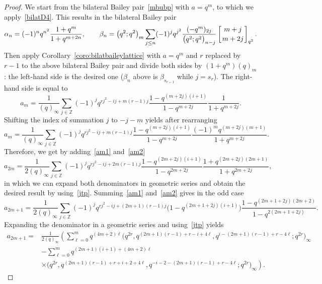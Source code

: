 \documentclass[pdftex]{sigma}
\numberwithin{equation}{section}
\begin{document}
\begin{proof}
We start from the bilateral Bailey pair~\eqref{mbubp} with $a=q^m$, to which we apply~\eqref{bilatD4}. This results in the bilateral Bailey pair
\begin{equation*}
\alpha_n=(-1)^nq^{n^2}\frac{1+q^{m}}{1+q^{m+2n}},\qquad\beta_n=\bigl(q^2;q^2\bigr)_m\sum_{j\leq n}(-1)^jq^{j^2}\frac{(-q^m)_{2j}}{\bigl(q^2;q^2\bigr)_{n-j}}\left[{m+j\atop m+2j}\right]_{q^2}.
\end{equation*}
Then apply Corollary~\ref{coro:bilatbaileylattice} with $a=q^m$ and $r$ replaced by $r-1$ to the above bilateral Bailey pair and divide both sides by $(1+q^m)(q)_m$: the left-hand side is the desired one ($\beta_n$ above is $\beta_{s_{r-1}}$ while $j=s_r$). The right-hand side is equal to
\begin{equation}\label{am1}
a_m=\frac{1}{(q)_\infty}\sum_{j\in\mathbb{Z}}(-1)^jq^{rj^2-ij+m(r-1)j}\frac{1-q^{(m+2j)(i+1)}}{1-q^{m+2j}}\frac{1}{1+q^{m+2j}}.
\end{equation}
Shifting the index of summation $j$ to $-j-m$ yields after rearranging
\begin{equation}\label{am2}
a_m=\frac{1}{(q)_\infty}\sum_{j\in\mathbb{Z}}(-1)^jq^{rj^2-ij+m(r-1)j}\frac{1-q^{(m+2j)(i+1)}}{1-q^{m+2j}}\frac{(-1)^mq^{(m+2j)(m+1)}}{1+q^{m+2j}}.
\end{equation}
Therefore, we get by adding~\eqref{am1} and~\eqref{am2}
\begin{equation*}
a_{2m}=\frac{1}{2(q)_\infty}\sum_{j\in\mathbb{Z}}(-1)^jq^{rj^2-ij+2m(r-1)j}\frac{1-q^{(2m+2j)(i+1)}}{1-q^{2m+2j}}\frac{1+q^{(2m+2j)(2m+1)}}{1+q^{2m+2j}},
\end{equation*}
in which we can expand both denominators in geometric series and obtain the desired result by using~\eqref{jtp}. Summing~\eqref{am1} and~\eqref{am2} gives in the odd case
\begin{equation*}
a_{2m+1}=\frac{1}{2(q)_\infty}\sum_{j\in\mathbb{Z}}(-1)^jq^{rj^2-ij+(2m+1)(r-1)j}\bigl(1-q^{(2m+1+2j)(i+1)}\bigr)\frac{1-q^{(2m+1+2j)(2m+2)}}{1-q^{2(2m+1+2j)}}.
\end{equation*}
Expanding the denominator in a geometric series and using~\eqref{jtp} yields
\begin{align*}
a_{2m+1}={}&\frac{1}{2(q)_\infty}\left(\sum_{\ell=0}^{m}q^{(4m+2)\ell}\bigl(q^{2r},q^{(2m+1)(r-1)+r-i+4\ell},q^{i-(2m+1)(r-1)+r-4\ell};q^{2r}\bigr)_\infty\right.\\
&\left.-\sum_{\ell=0}^{m}q^{(2m+1)(i+1)+(4m+2)\ell}\right.\\
&\left.\times\bigl(q^{2r},q^{(2m+1)(r-1)+r+i+2+4\ell},q^{-i-2-(2m+1)(r-1)+r-4\ell};q^{2r}\bigr)_\infty\right).

\end{align*}
\end{proof}
\end{document}
